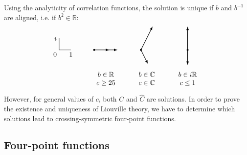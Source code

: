 \documentclass[12pt, a4paper]{article}
\theoremstyle{break}
\begin{document}
Using the analyticity of correlation functions, 
the solution is unique if $b$ and $b^{-1}$ are aligned, i.e. if $b^2\in\mathbb{R}$:
\begin{equation}
 \begin{tikzpicture}[baseline=(current  bounding  box.center), scale = .6]
\draw (0, 2) node[left]{$i$} -- (0, 1) node[below left] {$0$} -- (1, 1) node[below] {$1$};
\draw [thick, latex-latex] (11,3) -- (11,1) node[fill, circle, minimum size = 1mm, inner sep = 0]{} -- (11,-.3);
\draw [thick, latex-latex] (8,3) -- (7,1) node[fill, circle, minimum size = 1mm, inner sep = 0]{}-- (7.6,-.2);
\draw [thick, latex-latex] (5,1) -- (3,1) node[fill, circle, minimum size = 1mm, inner sep = 0]{} -- (4.3,1) ;
\node at (4, -1.5){$\begin{array}{c} b\in \mathbb{R} \\ c\geq 25 \end{array}$};
\node at (7.5, -1.5){$\begin{array}{c} b\in \mathbb{C} \\ c\in\mathbb{C} \end{array}$};
\node at (11, -1.5){$\begin{array}{c} b\in i\mathbb{R} \\ c\leq 1 \end{array}$};
 \end{tikzpicture}
\end{equation}
However, for general values of $c$, both $C$ and $\hat C$ are solutions. In order to prove the existence and uniqueness of Liouville theory, we have to determine which solutions lead to crossing-symmetric four-point functions.


\subsection{Four-point functions}
\end{document}
